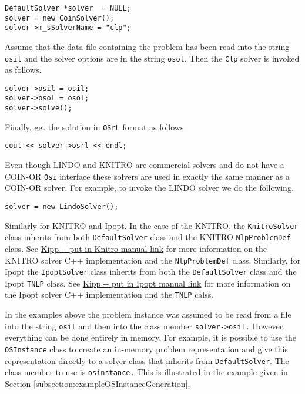 \documentclass[11pt]{article}
\renewcommand{\_}{{\char"5F}}
\renewcommand{\{}{{\char"7B}}
\renewcommand{\}}{{\char"7D}}
\renewcommand{\^}{{\char"0D}}
\renewcommand{\'}{{\char"0D}}
\begin{document}
\begin{verbatim}
DefaultSolver *solver  = NULL;
solver = new CoinSolver();
solver->m_sSolverName = "clp";
\end{verbatim}

Assume that the data file containing the problem has been read into the string {\tt osil} and the solver options are in the string {\tt osol}. Then the {\tt Clp} solver is invoked as follows.

\begin{verbatim}
solver->osil = osil;
solver->osol = osol;
solver->solve();
\end{verbatim}

Finally, get the solution in {\tt OSrL} format as follows

\begin{verbatim}
cout << solver->osrl << endl;
\end{verbatim}

Even though LINDO and KNITRO are commercial solvers and do not have a COIN-OR {\tt Osi} interface these solvers are used in exactly the same manner as a COIN-OR solver. For example, to invoke the LINDO solver we do the following.

\begin{verbatim}
solver = new LindoSolver();	
\end{verbatim}

Similarly for KNITRO and Ipopt. In the case of the KNITRO, the {\tt KnitroSolver} class inherits from both {\tt DefaultSolver} class and the KNITRO {\tt NlpProblemDef} class. See \url{Kipp -- put in Knitro manual link} for more information on the KNITRO solver C++ implementation and the {\tt NlpProblemDef} class. Similarly, for Ipopt the {\tt IpoptSolver} class inherits from both the  {\tt DefaultSolver} class and the Ipopt {\tt TNLP} class.  See \url{Kipp -- put in Ipopt manual link} for more information on the Ipopt solver C++ implementation and the {\tt TNLP} calss.

In the examples above the problem instance was assumed to be read from a file into the string {\tt osil} and then into the class member {\tt solver->osil.} However, everything can be done entirely in memory. For example, it is possible to use the {\tt OSInstance} class to create an in-memory problem representation and give this representation directly to a solver class that inherits from {\tt DefaultSolver}. The class member to use is {\tt osinstance.} This is illustrated in the example given in Section \ref{subsection:exampleOSInstanceGeneration}.
\end{document}
